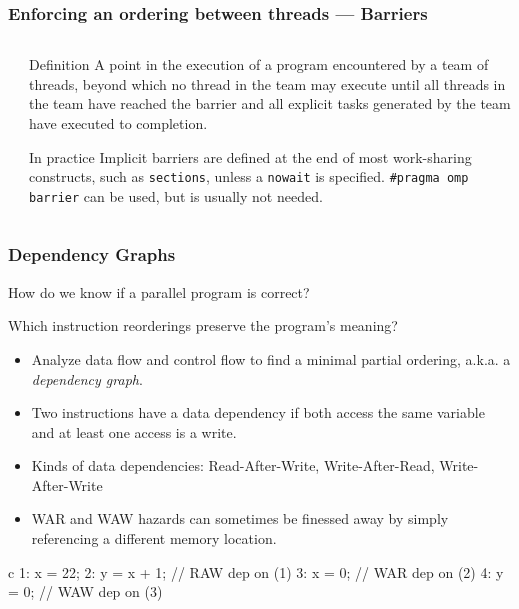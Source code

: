 \documentclass[handout]{beamer}
\begin{document}
\begin{frame}[fragile]
  \frametitle{Enforcing an ordering between threads --- Barriers}
  \begin{columns}[t]%
    \begin{column}{0.65\textwidth}
    \end{column}
    \pause
    \begin{column}{0.4\textwidth}
      \begin{block}{Definition}
      A point in the execution of a program encountered by a team of threads, beyond which no thread in the team may execute until all threads in the team have reached the barrier and all explicit tasks generated by the team have executed to completion. 
      \end{block}
      \begin{block}{In practice}
        Implicit barriers are defined at the end of most work-sharing constructs, such as \texttt{sections}, unless a \texttt{nowait} is specified. \texttt{\#pragma omp barrier} can be used, but is usually not needed.
      \end{block}
    \end{column}
  \end{columns}
\end{frame}


\begin{frame}[fragile]
  \frametitle{Dependency Graphs}

  How do we know if a parallel program is correct? 

  Which instruction reorderings preserve the program's meaning?

  \begin{itemize}

  \item Analyze data flow and control flow to find a minimal partial ordering, a.k.a. a \emph{dependency graph}.

  \item Two instructions have a data dependency if both access the same variable and at least one access is a write.

  \item Kinds of data dependencies: Read-After-Write, Write-After-Read, Write-After-Write

  \item WAR and WAW hazards can sometimes be finessed away by simply referencing a different memory location.

  \end{itemize}

      \begin{ccode}[]
        {c}
        1: x = 22;
        2: y = x + 1;     // RAW dep on (1)
        3: x = 0;         // WAR dep on (2)
        4: y = 0;         // WAW dep on (3)
      \end{ccode}
\end{frame}
\end{document}

